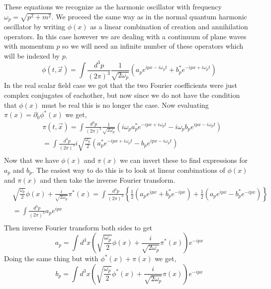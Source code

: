 \documentclass{article}
\numberwithin{equation}{section}
\newcommand{\dpint}{\int \frac{d^3p}{(2\pi)^3}}
\newcommand{\beq}{\begin{equation}}
\newcommand{\eeq}{\end{equation}}
\begin{document}
These equations we recognize as the harmonic oscillator with frequency $\omega_p = \sqrt{p^2+m^2}$. We proceed the same way as in the normal quantum harmonic oscillator
by writing $\phi(x)$ as a linear combination of creation and annihilation operators. In this case however we are dealing with a continuum of plane waves with momentum $p$ so we will need an infinite number of these operators which will be indexed by $p$.
\beq
    \phi(t,\vec{x}) = \dpint \frac{1}{\sqrt{2\omega_p}} \left( a_p e^{ipx-i\omega_p t} + b^*_p e^{-ipx+i\omega_p t} \right)
\eeq
In the real scalar field case we got that the two Fourier coefficients were just complex conjugates of eachother, but now since we do not have the condition that $\phi(x)$
must be real this is no longer the case. Now evaluating $\pi(x)=\partial_0 \phi^*(x)$ we get,
\beq \begin{split}
    &\pi(t,\vec{x}) = \dpint \frac{1}{\sqrt{2\omega_p}} \left( i \omega_p a^*_p e^{-ipx+i\omega_p t} - i\omega_p b_p e^{ipx-i\omega_p t} \right)\\
     &= \dpint i \sqrt{\frac{\omega_p}{2}} \left( a^*_p e^{-ipx+i\omega_p t} - b_p e^{ipx-i\omega_p t} \right)\\
\end{split} \eeq
Now that we have $\phi(x)$ and $\pi(x)$ we can invert these to find expressions for $a_p$ and $b_p$. The easiest way to do this is to look at linear combinations of 
$\phi(x)$ and $\pi(x)$ and then take the inverse Fourier transform.
\beq \begin{split}
    &\sqrt{\frac{\omega_p}{2}}\phi(x)+\frac{i}{\sqrt{2\omega_p}}\pi^*(x) = \dpint \left\{ \frac{1}{2} \left( a_pe^{ipx}+b^*_p e^{-ipx}\right) +\frac{1}{2}\left(a_p e^{ipx} - b^*_p e^{-ipx} \right)  \right\} \\
    &= \dpint a_p e^{ipx} \\
\end{split} \eeq
Then inverse Fourier transform both sides to get
\beq
    a_p = \int d^3x \left( \sqrt{\frac{\omega_p}{2}} \phi(x) + \frac{i}{\sqrt{2\omega_p}} \pi^*(x) \right) e^{-ipx}
\eeq
Doing the same thing but with $\phi^*(x) + \pi(x)$ we get,
\beq
    b_p = \int d^3x\left( \sqrt{\frac{\omega_p}{2}} \phi^*(x) + \frac{i}{\sqrt{2\omega_p}} \pi(x) \right) e^{-ipx}
\eeq
\end{document}
